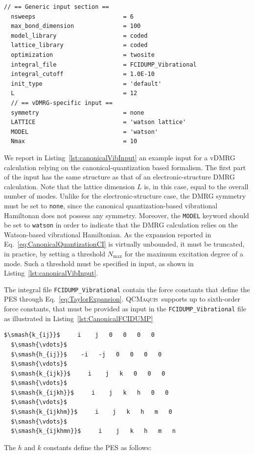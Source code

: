 \documentclass[bibliography=totoc,12pt,a4paper]{scrartcl}
\newcommand{\qcm}{\textsc{QCMaquis}}
\begin{document}
\begin{lstlisting}[language=qcmaquis,
				   caption={Input example for a canonical quantization-based vDMRG-FCI calculation},
				   label=lst:canonicalVibInput]
  // == Generic input section ==
  nsweeps                         = 6
  max_bond_dimension              = 100
  model_library                   = coded
  lattice_library                 = coded
  optimization                    = twosite 
  integral_file                   = FCIDUMP_Vibrational
  integral_cutoff                 = 1.0E-10
  init_type                       = 'default'
  L                               = 12
  // == vDMRG-specific input ==
  symmetry                        = none
  LATTICE                         = 'watson lattice'
  MODEL                           = 'watson'
  Nmax                            = 10
\end{lstlisting}

We report in Listing~\ref{lst:canonicalVibInput} an example input for a vDMRG calculation relying on the canonical-quantization based formalism.
The first part of the input has the same structure as that of an electronic-structure DMRG calculation.
Note that the lattice dimension $L$ is, in this case, equal to the overall number of modes.
Unlike for the electronic-structure case, the DMRG symmetry must be set to \texttt{none}, since the canonical quantization-based vibrational Hamiltonan does not possess any symmetry.
Moreover, the \texttt{MODEL} keyword should be set to \texttt{watson} in order to indicate that the DMRG calculation relies on the Watson-based vibrational Hamiltonian.
As the expansion reported in Eq.~\ref{eq:CanonicalQuantizationCI} is virtually unbounded, it must be truncated, in practice, by setting a threshold $N_\text{max}$ for the maximum excitation degree of a mode.
Such a threshold must be specified in input, as shown in Listing~\ref{lst:canonicalVibInput}.

The integral file \texttt{FCIDUMP\_Vibrational} contain the force constants that define the PES through Eq.~\ref{eq:TaylorExpansion}.
\qcm\ supports up to sixth-order force constants, that must be provided as input in the \texttt{FCIDUMP\_Vibrational} file as illustrated in Listing~\ref{lst:CanonicalFCIDUMP}
\vspace{.5cm}
\begin{lstlisting}[language=qcmaquis,caption={Example of an vDMRG integral file for the potential
											  expressed in the canonical quantization format.},
				   label=lst:CanonicalFCIDUMP, mathescape=true, rulecolor=\color{black}]
  $\smash{k_{ij}}$     i    j   0   0   0   0
  $\smash{\vdots}$
  $\smash{h_{ij}}$    -i   -j   0   0   0   0
  $\smash{\vdots}$
  $\smash{k_{ijk}}$     i    j   k   0   0   0
  $\smash{\vdots}$
  $\smash{k_{ijkh}}$     i    j   k   h   0   0
  $\smash{\vdots}$
  $\smash{k_{ijkhm}}$     i    j   k   h   m   0
  $\smash{\vdots}$
  $\smash{k_{ijkhmn}}$     i    j   k   h   m   n
\end{lstlisting}
\vspace{.5cm}
The $h$ and $k$ constants define the PES as follows:
\end{document}
